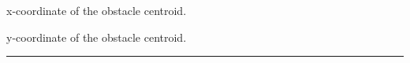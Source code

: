 \documentclass[letterpaper,10pt,english]{sphinxmanual}
\begin{document}
\begin{fulllineitems}
\begin{fulllineitems}
\end{fulllineitems}


\begin{fulllineitems}
\label{Multi-robot motion planner:planning_sim.PolygonObstacle.x}
x-coordinate of the obstacle centroid.

\end{fulllineitems}


\begin{fulllineitems}
\label{Multi-robot motion planner:planning_sim.PolygonObstacle.y}
y-coordinate of the obstacle centroid.

\end{fulllineitems}


\end{fulllineitems}


\begin{DUlineblock}{0em}
\item[] 
\end{DUlineblock}


\bigskip\hrule{}\bigskip

\end{document}
